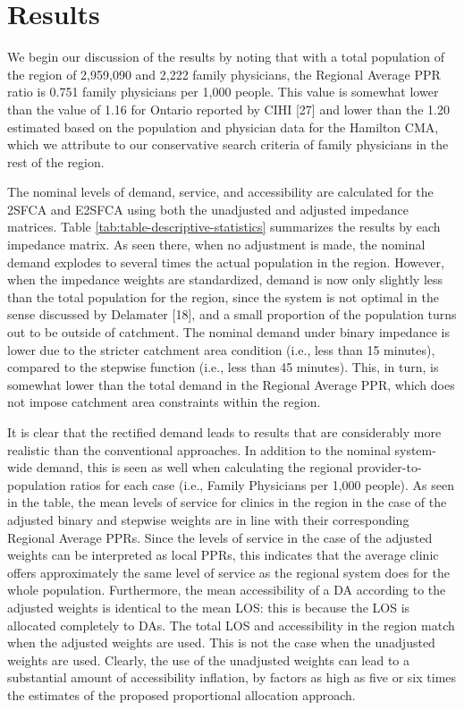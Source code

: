 \documentclass[10pt,letterpaper]{article}
\begin{document}
\section{Results}\label{results}

We begin our discussion of the results by noting that with a total
population of the region of 2,959,090 and 2,222 family physicians, the
Regional Average PPR ratio is 0.751 family physicians per 1,000 people.
This value is somewhat lower than the value of 1.16 for Ontario reported
by CIHI {[}27{]} and lower than the 1.20 estimated based on the
population and physician data for the Hamilton CMA, which we attribute
to our conservative search criteria of family physicians in the rest of
the region.

The nominal levels of demand, service, and accessibility are calculated
for the 2SFCA and E2SFCA using both the unadjusted and adjusted
impedance matrices. Table \ref{tab:table-descriptive-statistics}
summarizes the results by each impedance matrix. As seen there, when no
adjustment is made, the nominal demand explodes to several times the
actual population in the region. However, when the impedance weights are
standardized, demand is now only slightly less than the total population
for the region, since the system is not optimal in the sense discussed
by Delamater {[}18{]}, and a small proportion of the population turns
out to be outside of catchment. The nominal demand under binary
impedance is lower due to the stricter catchment area condition (i.e.,
less than 15 minutes), compared to the stepwise function (i.e., less
than 45 minutes). This, in turn, is somewhat lower than the total demand
in the Regional Average PPR, which does not impose catchment area
constraints within the region.

It is clear that the rectified demand leads to results that are
considerably more realistic than the conventional approaches. In
addition to the nominal system-wide demand, this is seen as well when
calculating the regional provider-to-population ratios for each case
(i.e., Family Physicians per 1,000 people). As seen in the table, the
mean levels of service for clinics in the region in the case of the
adjusted binary and stepwise weights are in line with their
corresponding Regional Average PPRs. Since the levels of service in the
case of the adjusted weights can be interpreted as local PPRs, this
indicates that the average clinic offers approximately the same level of
service as the regional system does for the whole population.
Furthermore, the mean accessibility of a DA according to the adjusted
weights is identical to the mean LOS: this is because the LOS is
allocated completely to DAs. The total LOS and accessibility in the
region match when the adjusted weights are used. This is not the case
when the unadjusted weights are used. Clearly, the use of the unadjusted
weights can lead to a substantial amount of accessibility inflation, by
factors as high as five or six times the estimates of the proposed
proportional allocation approach.
\end{document}
